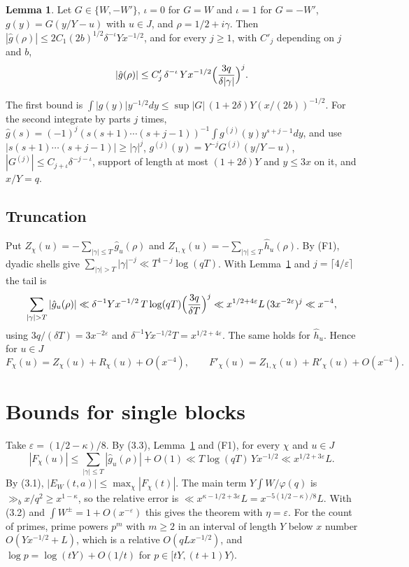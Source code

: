 \documentclass[11pt]{amsart}
\makeatletter
\theoremstyle{definition}
\newtheorem{lemma}[theorem]{Lemma}
\numberwithin{equation}{section}
\renewenvironment{proof}[1][\proofname]{\par\pushQED{\qed}\normalfont\topsep6\p@\@plus6\p@\relax\trivlist\item[\hskip\labelsep\upshape#1.]\ignorespaces}{\popQED\endtrivlist\@endpefalse}
\makeatother
\begin{document}
\begin{lemma}\label{lem:mellin}
Let $G\in\{W,-W'\}$, $\iota=0$ for $G=W$ and $\iota=1$ for $G=-W'$, $g(y)=G(y/Y-u)$ with $u\in J$, and $\rho=1/2+i\gamma$. Then $|\hat g(\rho)|\le2C_1(2b)^{1/2}\delta^{-\iota}Yx^{-1/2}$, and for every $j\ge1$, with $C'_j$ depending on $j$ and $b$,
\[
|\hat g(\rho)|\le C'_j\,\delta^{-\iota}\,Yx^{-1/2}\Bigl(\frac{3q}{\delta|\gamma|}\Bigr)^{j}.
\]
\end{lemma}

\begin{proof}
The first bound is $\int|g(y)|y^{-1/2}dy\le\sup|G|\,(1+2\delta)Y(x/(2b))^{-1/2}$. For the second integrate by parts $j$ times, $\hat g(s)=(-1)^j(s(s+1)\cdots(s+j-1))^{-1}\int g^{(j)}(y)y^{s+j-1}dy$, and use $|s(s+1)\cdots(s+j-1)|\ge|\gamma|^j$, $g^{(j)}(y)=Y^{-j}G^{(j)}(y/Y-u)$, $|G^{(j)}|\le C_{j+\iota}\delta^{-j-\iota}$, support of length at most $(1+2\delta)Y$ and $y\le3x$ on it, and $x/Y=q$.
\end{proof}

\subsection{Truncation}
Put $Z_\chi(u)=-\sum_{|\gamma|\le T}\hat g_u(\rho)$ and $Z_{1,\chi}(u)=-\sum_{|\gamma|\le T}\hat h_u(\rho)$. By (F1), dyadic shells give $\sum_{|\gamma|>T}|\gamma|^{-j}\ll T^{1-j}\log(qT)$. With Lemma~\ref{lem:mellin} and $j=\lceil4/\varepsilon\rceil$ the tail is
\[
\sum_{|\gamma|>T}|\hat g_u(\rho)|\ll\delta^{-1}Yx^{-1/2}\,T\log(qT)\Bigl(\frac{3q}{\delta T}\Bigr)^{j}\ll x^{1/2+4\varepsilon}L\,(3x^{-2\varepsilon})^{j}\ll x^{-4},
\]
using $3q/(\delta T)=3x^{-2\varepsilon}$ and $\delta^{-1}Yx^{-1/2}T=x^{1/2+4\varepsilon}$. The same holds for $\hat h_u$. Hence for $u\in J$
\[
F_\chi(u)=Z_\chi(u)+R_\chi(u)+O(x^{-4}),\qquad F'_\chi(u)=Z_{1,\chi}(u)+R'_\chi(u)+O(x^{-4}).
\tag{3.3}
\]

\section{Bounds for single blocks}\label{sec:blocks}

\begin{proof}[Proof of Theorem~\ref{thm:block}]
Take $\varepsilon=(1/2-\kappa)/8$. By (3.3), Lemma~\ref{lem:mellin} and (F1), for every $\chi$ and $u\in J$
\[
|F_\chi(u)|\le\sum_{|\gamma|\le T}|\hat g_u(\rho)|+O(1)\ll T\log(qT)\,Yx^{-1/2}\ll x^{1/2+3\varepsilon}L.
\]
By (3.1), $|E_W(t,a)|\le\max_\chi|F_\chi(t)|$. The main term $Y\int W/\varphi(q)$ is $\gg_b x/q^2\ge x^{1-\kappa}$, so the relative error is $\ll x^{\kappa-1/2+3\varepsilon}L=x^{-5(1/2-\kappa)/8}L$. With (3.2) and $\int W^\pm=1+O(x^{-\varepsilon})$ this gives the theorem with $\eta=\varepsilon$. For the count of primes, prime powers $p^m$ with $m\ge2$ in an interval of length $Y$ below $x$ number $O(Yx^{-1/2}+L)$, which is a relative $O(qLx^{-1/2})$, and $\log p=\log(tY)+O(1/t)$ for $p\in[tY,(t+1)Y)$.
\end{proof}
\end{document}
